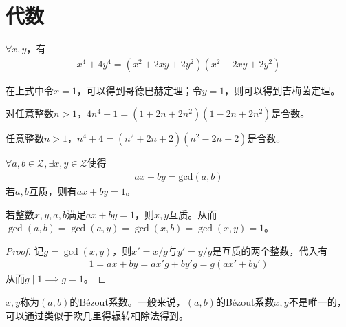 \section{代数}
\label{sec:algebra-identities}

\begin{theorem}
  $\forall x,y$，有
  \begin{align*}
    x^4 + 4y^4 = (x^2 + 2xy + 2y^2)(x^2 - 2xy + 2y^2)
  \end{align*}
\end{theorem}
在上式中令$x=1$，可以得到哥德巴赫定理；令$y=1$，则可以得到吉梅茵定理。
\begin{theorem}\mbox{}\par
  对任意整数$n>1$，$4n^4+1=(1+2n+2n^2)(1-2n+2n^2)$是合数。  
\end{theorem}
\begin{theorem}\mbox{}\par
  任意整数$n>1$，$n^4+4=(n^2+2n+2)(n^2-2n+2)$是合数。
\end{theorem}


\begin{theorem}\label{th:Bezout}
  $\forall a,b\in\mathcal{Z},\exists x,y\in\mathcal{Z}$使得
  \begin{align*}
    ax+by=\mathrm{gcd}(a,b)
  \end{align*}
  若$a,b$互质，则有$ax+by=1$。
\end{theorem}

\begin{theorem}\label{th:inverse-bezout}
  若整数$x,y,a,b$满足$ax+by=1$，则$x,y$互质。从而$\gcd(a,b)=\gcd(a,y)=\gcd(x,b)=\gcd(x,y)=1$。
\end{theorem}
\begin{proof}
  记$g=\gcd(x,y)$，则$x'=x/g$与$y'=y/g$是互质的两个整数，代入有
  \begin{align*}
    1=ax+by=ax'g+by'g=g(ax'+by')
  \end{align*}
  从而$g\mid 1\implies g=1$。
\end{proof}

$x,y$称为$(a,b)$的B\'ezout系数。一般来说，$(a,b)$的B\'ezout系数$x,y$不是唯一的，可以通过类似于欧几里得辗转相除法得到。

